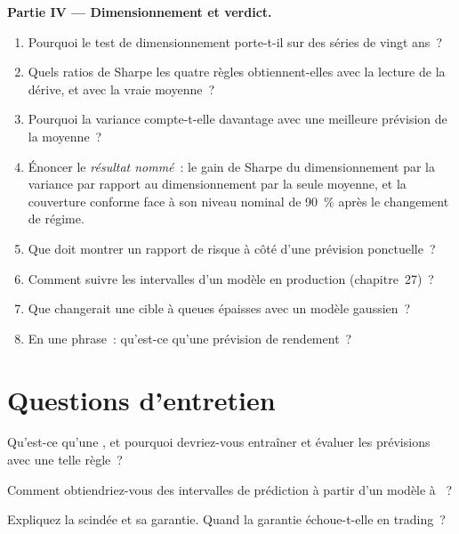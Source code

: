 \begin{problem}
\medskip\noindent\textbf{Partie IV --- Dimensionnement et verdict.}
\begin{enumerate}[resume]
\item Pourquoi le test de dimensionnement porte-t-il sur des séries de vingt ans~?
\item Quels ratios de Sharpe les quatre règles obtiennent-elles avec la lecture de la dérive, et avec la vraie moyenne~?
\item Pourquoi la variance compte-t-elle davantage avec une meilleure prévision de la moyenne~?
\item Énoncer le \emph{résultat nommé}~: le gain de Sharpe du dimensionnement par la variance par rapport au dimensionnement par la seule moyenne, et la couverture conforme
face à son niveau nominal de 90~\% après le changement de régime.
\item Que doit montrer un rapport de risque à côté d'une prévision ponctuelle~?
\item Comment suivre les intervalles d'un modèle en production (chapitre~27)~?
\item Que changerait une cible à queues épaisses avec un modèle gaussien~?
\item En une phrase~: qu'est-ce qu'une prévision de rendement~?
\end{enumerate}
\end{problem}

\section{Questions d'entretien}

\begin{interviewq}\label{iq:ml:probabilistic-models-and-uncertainty:1}
Qu'est-ce qu'une , et pourquoi devriez-vous entraîner et évaluer les prévisions avec une telle règle~?
\end{interviewq}

\begin{interviewq}\label{iq:ml:probabilistic-models-and-uncertainty:2}
Comment obtiendriez-vous des intervalles de prédiction à partir d'un modèle à ~?
\end{interviewq}

\begin{interviewq}\label{iq:ml:probabilistic-models-and-uncertainty:3}
Expliquez la  scindée et sa garantie. Quand la garantie échoue-t-elle en trading~?
\end{interviewq}

